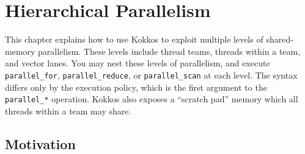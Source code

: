 \chapter{Hierarchical Parallelism}\label{C:Hierarchical}

This chapter explains how to use Kokkos to exploit multiple levels of shared-memory parallelism.
These levels include thread teams, threads within a team, and vector lanes.
You may nest these levels of parallelism,
and execute \lstinline!parallel_for!, \lstinline!parallel_reduce!, or \lstinline!parallel_scan! at each level.
The syntax differs only by the execution policy,
which is the first argument to the \verb!parallel_*! operation.
Kokkos also exposes a ``scratch pad'' memory which all threads within a team may share.

\section{Motivation}\label{S:Hierarchical:Motivation}

